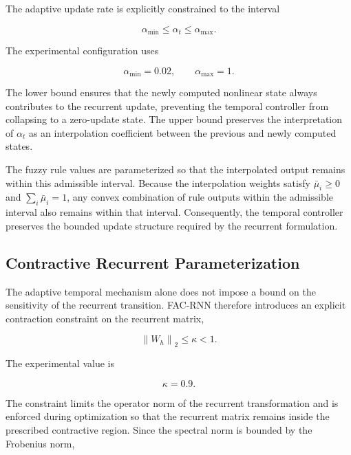 \documentclass[journal]{IEEEtran}
\begin{document}
The adaptive update rate is explicitly constrained to the interval

\begin{equation}
	\alpha_{\min}
	\leq
	\alpha_t
	\leq
	\alpha_{\max}.
	\label{eq:alpha_bounds}
\end{equation}

The experimental configuration uses

\begin{equation}
	\alpha_{\min}=0.02,
	\qquad
	\alpha_{\max}=1.
	\label{eq:alpha_values}
\end{equation}

The lower bound ensures that the newly computed nonlinear state always contributes to the recurrent update, preventing the temporal controller from collapsing to a zero-update state. The upper bound preserves the interpretation of $\alpha_t$ as an interpolation coefficient between the previous and newly computed states.

The fuzzy rule values are parameterized so that the interpolated output remains within this admissible interval. Because the interpolation weights satisfy $\bar{\mu}_i\geq0$ and $\sum_i\bar{\mu}_i=1$, any convex combination of rule outputs within the admissible interval also remains within that interval. Consequently, the temporal controller preserves the bounded update structure required by the recurrent formulation.

\subsection{Contractive Recurrent Parameterization}
\label{subsec:contractive_parameterization}

The adaptive temporal mechanism alone does not impose a bound on the sensitivity of the recurrent transition. FAC-RNN therefore introduces an explicit contraction constraint on the recurrent matrix,

\begin{equation}
	\left\lVert W_h\right\rVert_2
	\leq
	\kappa
	<
	1.
	\label{eq:weight_constraint}
\end{equation}

The experimental value is

\begin{equation}
	\kappa=0.9.
	\label{eq:kappa}
\end{equation}

The constraint limits the operator norm of the recurrent transformation and is enforced during optimization so that the recurrent matrix remains inside the prescribed contractive region. Since the spectral norm is bounded by the Frobenius norm,
\end{document}
